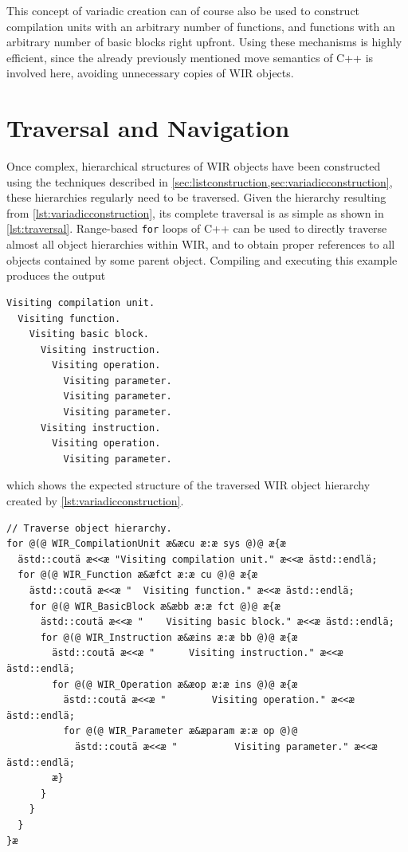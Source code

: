 This concept of variadic creation can of course also be used to construct compilation units with an arbitrary number of functions, and functions with an arbitrary number of basic blocks right upfront.
Using these mechanisms is highly efficient, since the already previously mentioned move semantics of C++ is involved here, avoiding unnecessary copies of \gls{WIR} objects.


\section{Traversal and Navigation}
\label{sec:traversal}

Once complex, hierarchical structures of \gls{WIR} objects have been constructed using the techniques described in \cref{sec:listconstruction,sec:variadicconstruction}, these hierarchies regularly need to be traversed.
Given the hierarchy resulting from \cref{lst:variadicconstruction}, its complete traversal is as simple as shown in \cref{lst:traversal}.
Range-based \texttt{for} loops of C++ can be used to directly traverse almost all object hierarchies within \gls{WIR}, and to obtain proper references to all objects contained by some parent object.
Compiling and executing this example produces the output

\begin{lstlisting}[style=commandline,float=h]
Visiting compilation unit.
  Visiting function.
    Visiting basic block.
      Visiting instruction.
        Visiting operation.
          Visiting parameter.
          Visiting parameter.
          Visiting parameter.
      Visiting instruction.
        Visiting operation.
          Visiting parameter.
\end{lstlisting}

which shows the expected structure of the traversed \gls{WIR} object hierarchy created by \cref{lst:variadicconstruction}.

\begin{lstlisting}[style=code,float=t,caption={Traversal of Object Hierarchies using Range-Based Loops},label=lst:traversal]
// Traverse object hierarchy.
for @(@ WIR_CompilationUnit æ&æcu æ:æ sys @)@ æ{æ
  ästd::coutä æ<<æ "Visiting compilation unit." æ<<æ ästd::endlä;
  for @(@ WIR_Function æ&æfct æ:æ cu @)@ æ{æ
    ästd::coutä æ<<æ "  Visiting function." æ<<æ ästd::endlä;
    for @(@ WIR_BasicBlock æ&æbb æ:æ fct @)@ æ{æ
      ästd::coutä æ<<æ "    Visiting basic block." æ<<æ ästd::endlä;
      for @(@ WIR_Instruction æ&æins æ:æ bb @)@ æ{æ
        ästd::coutä æ<<æ "      Visiting instruction." æ<<æ ästd::endlä;
        for @(@ WIR_Operation æ&æop æ:æ ins @)@ æ{æ
          ästd::coutä æ<<æ "        Visiting operation." æ<<æ ästd::endlä;
          for @(@ WIR_Parameter æ&æparam æ:æ op @)@
            ästd::coutä æ<<æ "          Visiting parameter." æ<<æ ästd::endlä;
        æ}
      }
    }
  }
}æ
\end{lstlisting}

